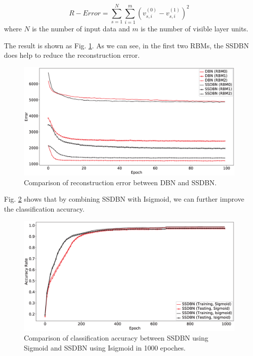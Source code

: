 \documentclass{bioinfo}
\begin{document}
\begin{equation}
R-Error = \sum_{s=1}^{N}\sum_{i=1}^{m}(v_{s,i}^{(0)}-v_{s,i}^{(1)})^2
\end{equation}
where $N$ is the number of input data and $m$ is the number of visible layer units.

The result is shown as Fig. \ref{fig:RBM012}. As we can see, in the first two RBMs, the SSDBN does help to reduce the reconstruction error.

\begin{figure}[htbp]
	\centering
	\includegraphics[width=\columnwidth]{RBM012.eps}
	\caption{Comparison of reconstruction error between DBN and SSDBN.}
	\label{fig:RBM012}
\end{figure}

Fig. \ref{fig:SSDBNIsigmoid} shows that by combining SSDBN with Isigmoid, we can further improve the classification accuracy.

\begin{figure}[htbp]
	\centering
	\includegraphics[width=\columnwidth]{SSDBNIsigmoid.eps}
	\caption{Comparison of classification accuracy between SSDBN using Sigmoid and SSDBN using Isigmoid in 1000 epoches.}
	\label{fig:SSDBNIsigmoid}
\end{figure}
\end{document}
